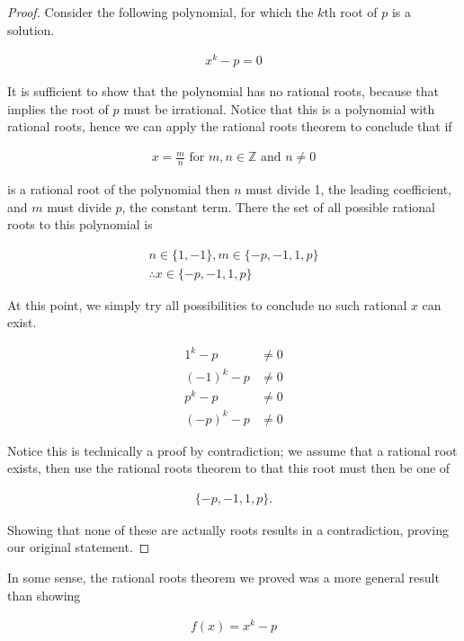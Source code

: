 \begin{proof}
	Consider the following polynomial, for which the $k$th root of $p$ is a solution. 

	\begin{align*}
		x^k - p = 0
	\end{align*}

	It is sufficient to show that the polynomial has no rational roots, because that implies the root of $p$ must be irrational. Notice that this is a polynomial with rational roots, hence we can apply the rational roots theorem to conclude that if
	
	\begin{align*}
		x = \frac{m}{n} \text{ for } m, n \in \mathbb{Z} \text{ and } n \neq 0
	\end{align*}
	
	is a rational root of the polynomial then $n$ must divide 1, the leading coefficient, and $m$ must divide $p$, the constant term. There the set of all possible rational roots to this polynomial is
	
	\begin{align*}
		n \in \{ 1, -1 \}, m \in \{ -p, -1, 1, p \} \\
		\therefore x \in \{ -p, -1, 1, p \}
	\end{align*}
	
	At this point, we simply try all possibilities to conclude no such rational $x$ can exist.
	
	\begin{align*}
		1^k - p &\neq 0 \\
		(-1)^k - p &\neq 0 \\
		p^k - p &\neq 0 \\
		(-p)^k - p &\neq 0
	\end{align*}
	
	Notice this is technically a proof by contradiction; we assume that a rational root exists, then use the rational roots theorem to that this root must then be one of
	
	\begin{align*}
		\{ -p, -1, 1, p \}.
	\end{align*}
	
	Showing that none of these are actually roots results in a contradiction, proving our original statement.
\end{proof}

In some sense, the rational roots theorem we proved was a more general result than showing

\begin{align*}
	f(x) = x^k - p
\end{align*}

